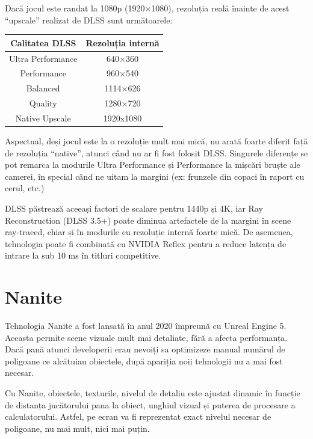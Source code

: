 Dacă jocul este randat la 1080p (1920×1080), rezoluția reală înainte de acest “upscale” realizat de DLSS sunt următoarele: 

\begin{center}
\begin{tabular}{||c c||} 
 \hline
 Calitatea DLSS & Rezoluția internă \\ [0.5ex] 
 \hline\hline
 Ultra Performance & 640×360 \\ 
 \hline
 Performance & 960×540  \\
 \hline
 Balanced & 1114×626 \\
 \hline
 Quality & 1280×720  \\ [1ex] 
 \hline
 Native Upscale & 1920x1080 \\ [1ex] 
 \hline
\end{tabular}
\end{center}


\noindent Aspectual, deși jocul este la o rezoluție mult mai mică, nu arată foarte diferit față de rezoluția “native”, atunci când nu ar fi fost folosit DLSS. Singurele diferențe se pot remarca la modurile Ultra Performance și Performance la mișcări bruște ale camerei, în special când ne uitam la margini (ex: frunzele din copaci în raport cu cerul, etc.)

DLSS păstrează aceeași factori de scalare pentru 1440p și 4K, iar Ray Reconstruction (DLSS 3.5+) poate diminua artefactele de la margini în scene ray-traced, chiar și în modurile cu rezoluție internă foarte mică. De asemenea, tehnologia poate fi combinată cu NVIDIA Reflex pentru a reduce latența de intrare la sub 10 ms în titluri competitive.

\section{Nanite}

Tehnologia Nanite a fost lansată în anul 2020 împreună cu Unreal Engine 5. Aceasta permite scene vizuale mult mai detaliate, fără a afecta performanța. Dacă pană atunci developerii erau nevoiți sa optimizeze manual numărul de poligoane ce alcătuiau obiectele, după apariția noii tehnologii nu a mai fost necesar. 

Cu Nanite, obiectele, texturile, nivelul de detaliu este ajustat dinamic în funcție de distanța jucătorului pana la obiect, unghiul vizual și puterea de procesare a calculatorului. Astfel, pe ecran va fi reprezentat exact nivelul necesar de poligoane, nu mai mult, nici mai puțin.

